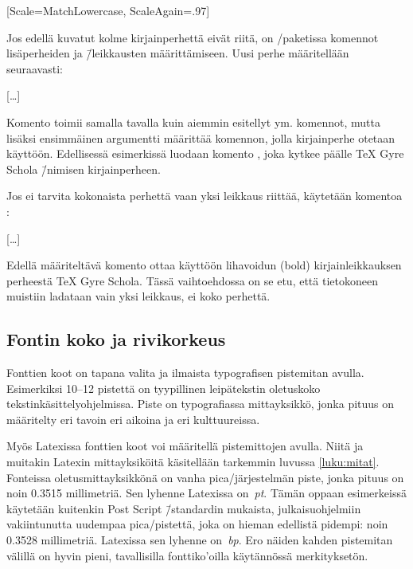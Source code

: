 \begin{koodilohkosis}
  \setmonofont{TeX Gyre Cursor}
  [Scale=MatchLowercase, ScaleAgain=.97]
\end{koodilohkosis}

\pagebreak[3]

Jos edellä kuvatut kolme kirjainperhettä eivät riitä, on
\-/paketissa komennot lisäperheiden ja \=/leikkausten
määrittämiseen. Uusi perhe määritellään seuraavasti:

\begin{koodilohkosis}
  […]
\end{koodilohkosis}

Komento  toimii samalla tavalla kuin
aiemmin esitellyt  ym. komennot, mutta
lisäksi ensimmäinen argumentti määrittää komennon, jolla kirjainperhe
otetaan käyttöön. Edellisessä esimerkissä luodaan komento , joka kytkee päälle TeX Gyre Scho\-la \=/nimisen
kirjainperheen.

\pagebreak[3]

Jos ei tarvita kokonaista perhettä vaan yksi leikkaus riittää, käytetään
komentoa :

\begin{koodilohkosis}
  […]
\end{koodilohkosis}

Edellä määriteltävä komento  ottaa käyttöön
lihavoidun (bold) kirjainleikkauksen perheestä TeX Gyre Scho\-la. Tässä
vaih\-to\-eh\-dos\-sa on se etu, että tietokoneen muistiin ladataan vain
yksi leikkaus, ei koko perhettä.

\subsection{Fontin koko ja rivikorkeus}

Fonttien koot on tapana valita ja ilmaista typografisen pistemitan
avulla. Esimerkiksi 10--12 pistettä on tyypillinen leipätekstin
oletuskoko teks\-tin\-kä\-sit\-tely\-ohjel\-mis\-sa. Piste on
typografiassa mitta\-yksikkö, jonka pituus on määritelty eri tavoin eri
aikoina ja eri kulttuureissa.

Myös Latexissa fonttien koot voi määritellä pistemittojen avulla. Niitä
ja muitakin Latexin mit\-ta\-yk\-si\-köi\-tä käsitellään tarkemmin
luvussa \ref{luku:mitat}. Fonteissa ole\-tus\-mitta\-yk\-sik\-kö\-nä on
vanha pica\-/järjestelmän piste, jonka pituus on noin \num{0,3515}
millimetriä. Sen lyhenne Latexissa on~\emph{pt}. Tämän oppaan
esimerkeissä käytetään kuitenkin Post Script \=/standardin mukaista,
julkaisuohjelmiin vakiintunutta uudempaa pica\-/pistettä, joka on hieman
edellistä pidempi: noin \num{0,3528} millimetriä. Latexissa sen lyhenne
on~\emph{bp}. Ero näiden kahden pistemitan välillä on hyvin pieni,
tavallisilla fonttiko'oilla käytännössä merkityksetön.


